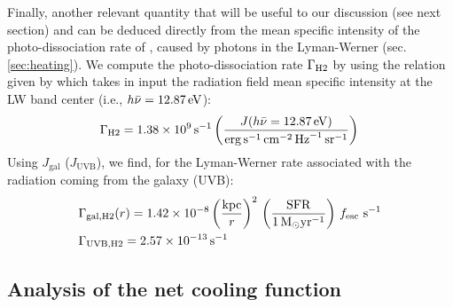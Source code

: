 Finally, another relevant quantity that will be useful to our discussion (see next section) and can be deduced directly from the mean specific intensity of the photo-dissociation rate of \HH, caused by photons in the Lyman-Werner (sec. \ref{sec:heating}). We compute the \HH photo-dissociation rate $\Gamma_{\rm{H2}}$ by using the relation given by \citet{anninos1997} which takes in input the radiation field mean specific intensity at the LW band center (i.e., $h\Bar{\nu} =12.87 \,\mathrm{eV}$):
\begin{align}
\Gamma_{\rm{H2}} = 1.38 \times 10^9 \, \mathrm{s}^{-1} \, \bigg(\frac{J(h\Bar{\nu}=12.87 \, \mathrm{eV})}{\mathrm{erg}\,\mathrm{s}^{-1}\,\mathrm{cm}^{-2}\,\mathrm{Hz}^{-1}\,\mathrm{sr}^{-1}}\bigg)\, \label{eq:lw}
\end{align}
Using $J_\mathrm{gal}$ ($J_\mathrm{UVB}$), we find, for the Lyman-Werner \HH rate associated with the radiation coming from the galaxy (UVB):
\begin{subequations}
\begin{align}
&\Gamma_{\rm{gal,H2}}(r)=1.42\times 10^{-8}\, \bigg(\frac{ \mathrm{kpc}}{r}\bigg)^2 \,\left(\frac{\mathrm{SFR}}{1\,{\rm M}_{\odot}\mathrm{yr}^{-1}}\right)\,f_{\rm esc} \,\, \mathrm{s}^{-1}\\
& \Gamma_{\mathrm{UVB,H2}}=2.57\times 10^{-13} \, \mathrm{s}^{-1}
\label{eq:Lw_profile}
\end{align}
\end{subequations}



\subsection{Analysis of the net cooling function} \label{sec:cooling_function}



